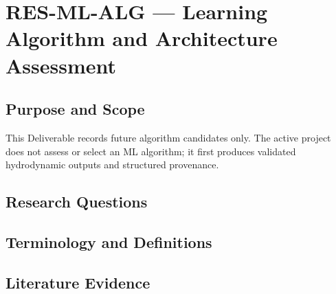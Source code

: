 
\section{RES-ML-ALG --- Learning Algorithm and Architecture Assessment}
\label{sec:res-ml-alg}

\subsection{Purpose and Scope}
\label{sec:res-ml-alg-purpose}

This Deliverable records future algorithm candidates only. The active
project does not assess or select an ML algorithm; it first produces
validated hydrodynamic outputs and structured provenance.

\subsection{Research Questions}
\label{sec:res-ml-alg-research-questions}


\subsection{Terminology and Definitions}
\label{sec:res-ml-alg-definitions}


\subsection{Literature Evidence}
\label{sec:res-ml-alg-literature-evidence}

%

